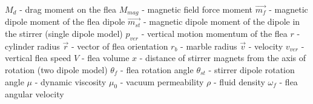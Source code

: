 \documentclass[10pt,a4paper]{article}
\begin{document}
$M_d$ - drag moment on the flea \newline
$M_{mag}$ - magnetic field force moment \newline
$\vec{m_f}$ - magnetic dipole moment of the flea dipole \newline
$\vec{m_{st}}$ - magnetic dipole moment of the dipole in the stirrer (single dipole model) \newline
$p_{ver}$ - vertical motion momentum of the flea \newline
$r$ - cylinder radius \newline
$\vec{r}$ - vector of flea orientation \newline
$r_b$ - marble radius \newline
$\vec{v}$ - velocity \newline
$v_{ver}$ - vertical flea speed \newline
$V$ - flea volume \newline
$x$ - distance of stirrer magnets from the axis of rotation (two dipole model) \newline
$\theta_f$ - flea rotation angle \newline
$\theta_{st}$ - stirrer dipole rotation angle \newline
$\mu$ - dynamic viscosity \newline
$\mu_0$ - vacuum permeability \newline
$\rho$ - fluid density \newline
$\omega_f$ - flea angular velocity \newline
\end{document}
